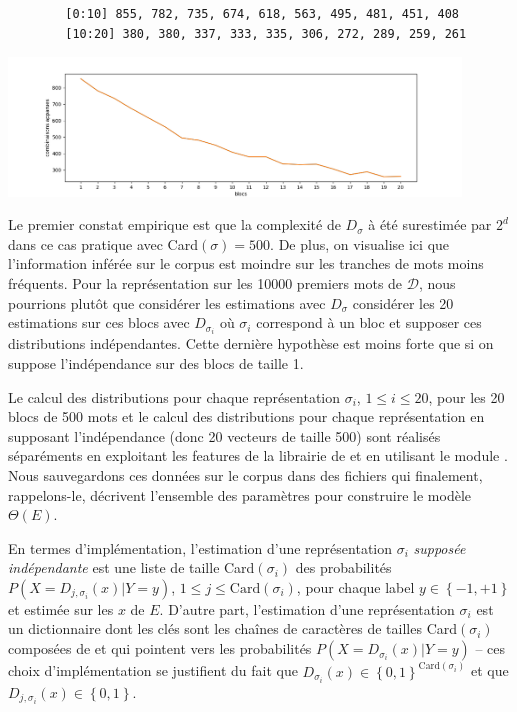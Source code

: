 \documentclass[a4paper, french]{article}
\begin{document}
\begin{table}[h]
\begin{center}
    \caption{\'Evaluation empirique de la complexit\'e de repr\'esentation}
    \label{table:combinaisons_decalages}
    \vskip 4mm
    \begin{lstlisting}
        [0:10] 855, 782, 735, 674, 618, 563, 495, 481, 451, 408
        [10:20] 380, 380, 337, 333, 335, 306, 272, 289, 259, 261
    \end{lstlisting}
    \includegraphics[width=12cm]{cn_decalages}
\end{center}
\end{table}

Le premier constat empirique est que la complexit\'e de $D_\sigma$ \`a \'et\'e
surestim\'ee par $2^d$ dans ce cas pratique avec Card$(\sigma)=500$. De plus,
on visualise ici que l'information inf\'er\'ee sur le corpus est moindre sur
les tranches de mots moins fr\'equents.
%
Pour la repr\'esentation sur les 10000 premiers mots de $\mathcal{D}$,
nous pourrions plut\^ot que consid\'erer les estimations avec $D_{\sigma}$
consid\'erer les 20 estimations sur ces blocs avec $D_{\sigma_i}$ o\`u
$\sigma_i$ correspond \`a un bloc et supposer ces distributions
ind\'ependantes.
Cette derni\`ere hypoth\`ese est moins forte que si on suppose
l'ind\'ependance sur des blocs de taille 1.

Le calcul des distributions pour chaque repr\'esentation ${\sigma_i}$,
$1\leq i\leq 20$, pour les 20 blocs de 500 mots et le calcul des distributions
pour chaque repr\'esentation en supposant l'ind\'ependance
(donc 20 vecteurs de taille 500) sont r\'ealis\'es s\'epar\'ements en exploitant
les features de la librairie  de 
et en utilisant le module .
Nous sauvegardons ces donn\'ees sur le corpus dans des fichiers qui finalement,
rappelons-le, d\'ecrivent l'ensemble des param\`etres pour construire le
mod\`ele $\Theta(E)$.

En termes d'impl\'ementation, l'estimation d'une repr\'esentation $\sigma_i$
\emph{suppos\'ee ind\'ependante} est une liste de taille Card$(\sigma_i)$
des probabilit\'es $P(X=D_{j,\sigma_i}(x)|Y=y)$, $1\leq j\leq \text{Card}(\sigma_i)$,
pour chaque label $y\in\left\{-1,+1\right\}$ et estim\'ee sur les $x$ de $E$.
D'autre part, l'estimation d'une repr\'esentation $\sigma_i$ est un dictionnaire
dont les cl\'es sont les cha\^ines de caract\`eres de tailles
Card$(\sigma_i)$ compos\'ees de  et 
qui pointent vers les probabilit\'es $P(X=D_{\sigma_i}(x)|Y=y)$ --
ces choix d'impl\'ementation se justifient du fait que
$D_{\sigma_i}(x)\in\left\{0,1\right\}^{\text{Card}(\sigma_i)}$ et
que $D_{j,\sigma_i}(x)\in\left\{0,1\right\}$.
\end{document}
